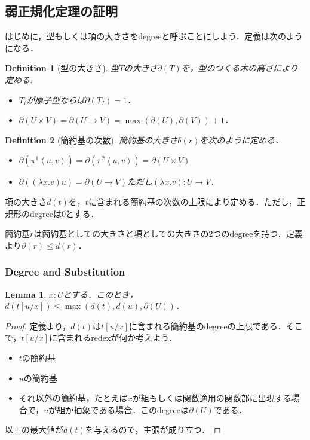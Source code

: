 \documentclass[a4paper,10pt,platex, dvipdfmx]{jsarticle}
\newtheorem{definition}{Definition}
\newtheorem{lemma}{Lemma}
\begin{document}
\subsection{弱正規化定理の証明}
はじめに，型もしくは項の大きさをdegreeと呼ぶことにしよう．定義は次のようになる．
\begin{definition}[型の大きさ]
型$T$の大きさ$\partial(T)$を，型のつくる木の高さにより定める:\begin{itemize}
\item $T_{i}$が原子型ならば$\partial(T_{I}) = 1$．
\item $\partial(U\times V) = \partial(U\rightarrow V) = \max(\partial(U), \partial(V)) + 1$．
\end{itemize}
\end{definition}
\begin{definition}[簡約基の次数]
    簡約基の大きさ$\delta(r)$を次のように定める．
\begin{itemize}
\item $\partial(\pi^{1}\left<u, v\right>) = \partial(\pi^{2}\left<u, v\right>) = \partial(U\times V)$
\item $\partial((\lambda x . v) u) = \partial(U\rightarrow V)$ただし$(\lambda x. v): U\rightarrow V$．
\end{itemize}
\end{definition}
項の大きさ$d(t)$を，$t$に含まれる簡約基の次数の上限により定める．ただし，正規形のdegreeは0とする．

\dbend 簡約基$r$は簡約基としての大きさと項としての大きさの2つのdegreeを持つ．定義より$\partial(r) \leq d(r)$．

\subsubsection{Degree and Substitution}
\begin{lemma}
    $x:U$とする．このとき，$d(t\left[u/x\right])\leq \max(d(t), d(u), \partial(U))$．
\end{lemma}
\begin{proof}
定義より，$d(t)$は$t\left[u/x\right]$に含まれる簡約基のdegreeの上限である．そこで，$t\left[u/x\right]$に含まれるredexが何か考えよう．\begin{itemize}
\item $t$の簡約基
\item $u$の簡約基
\item それ以外の簡約基，たとえば$x$が組もしくは関数適用の関数部に出現する場合で，$u$が組か抽象である場合．このdegreeは$\partial(U)$である．
\end{itemize}
以上の最大値が$d(t)$を与えるので，主張が成り立つ．
\end{proof}
\end{document}
